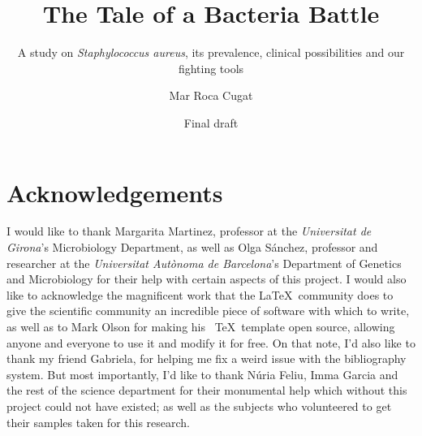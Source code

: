 \documentclass[fontsize=12pt,twoside=semi,openright,numbers=noenddot,parskip=half]{scrbook}
\title{The Tale of a Bacteria Battle}
\subtitle{A study on \emph{Staphylococcus aureus}, its prevalence, clinical possibilities and our fighting tools}
\author{Mar Roca Cugat}
\date{Final draft}
\begin{document}
\maketitle
\cleardoublepage
\renewcommand{\thepage}{\arabic{page}}
\frontmatter
\chapter{Acknowledgements}
\begin{center}
I would like to thank Margarita Martinez, professor at the \emph{Universitat de Girona}'s Microbiology Department, as well as Olga Sánchez, professor and researcher at the \emph{Universitat Autònoma de Barcelona}'s Department of Genetics and Microbiology for their help with certain aspects of this project. \newline
I would also like to acknowledge the magnificent work that the \LaTeX\ community does to give the scientific community an incredible piece of software with which to write, as well as to Mark Olson for making his \KOMAScript\ \TeX\ template open source, allowing anyone and everyone to use it and modify it for free. On that note, I'd also like to thank my friend Gabriela, for helping me fix a weird issue with the bibliography system.\newline
But most importantly, I'd like to thank Núria Feliu, Imma Garcia and the rest of the science department for their monumental help which without this project could not have existed; as well as the subjects who volunteered to get their samples taken for this research.\newline
\end{center}
\mainmatter\printindex\tableofcontents
\end{document}
